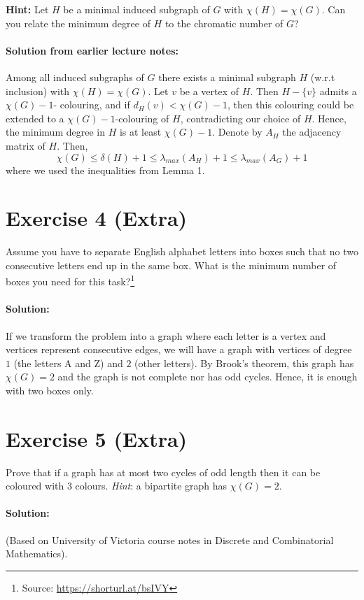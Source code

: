 \documentclass{article}
\begin{document}
\textbf{Hint:} Let $H$ be a minimal induced subgraph of $G$ with $\chi(H) = \chi(G)$. Can you relate the minimum degree of $H$ to the chromatic number of $G$?
  
\paragraph{Solution from earlier lecture notes:}

Among all induced subgraphs of $G$ there exists a minimal subgraph $H$ (w.r.t inclusion) with $\chi(H)= \chi(G)$. Let $v$ be a vertex of $H$. Then $H - \{v\}$ admits a $\chi(G) - 1$- colouring, and if $d_{H}(v) < \chi(G) - 1$, then this colouring could be extended to a $\chi(G) - 1$-colouring of $H$, contradicting our choice of $H$. Hence, the minimum degree in $H$ is at least $\chi(G) - 1$. Denote by $A_{H}$ the adjacency matrix of $H$. Then, 
$$\chi(G) \leq \delta(H) + 1 \leq \lambda_{max}(A_{H}) + 1\leq \lambda_{max}(A_{G}) + 1$$
where we used the inequalities from Lemma 1.

\section*{Exercise 4 (Extra)}
Assume you have to separate English alphabet letters into boxes such that no two consecutive letters end up in the same box. What is the minimum number of boxes you need for this task?\footnote{
  Source: \url{https://shorturl.at/bsIVY}
}

\paragraph{Solution:}
If we transform the problem into a graph where each letter is a vertex and vertices represent consecutive edges, we will have a graph with vertices of degree $1$ (the letters A and Z) and $2$ (other letters). By Brook's theorem, this graph has $\chi(G) = 2$ and the graph is not complete nor has odd cycles. Hence, it is enough with two boxes only.

\section*{Exercise 5 (Extra)}
Prove that if a graph has at most two cycles of odd length then it can be coloured with 3 colours. \textit{Hint}: a bipartite graph has $\chi(G) = 2$.

\paragraph{Solution:}
(Based on University of Victoria course notes in Discrete and Combinatorial Mathematics).
\end{document}
